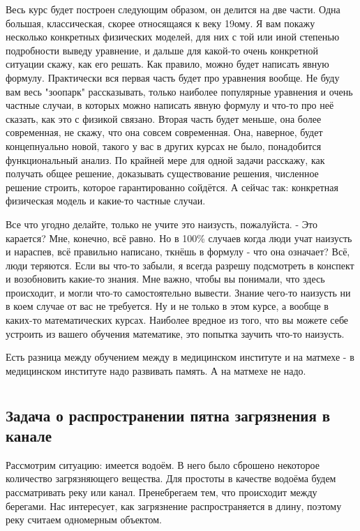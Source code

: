 Весь курс будет построен следующим образом, он делится на две части. Одна большая, классическая, скорее относящаяся к веку 19ому. Я вам покажу несколько конкретных физических моделей, для них с той или иной степенью подробности выведу уравнение, и дальше для какой-то очень конкретной ситуации скажу, как его решать. Как правило, можно будет написать явную формулу. Практически вся первая часть будет про уравнения вообще. Не буду вам весь "зоопарк" рассказывать, только наиболее популярные уравнения и очень частные случаи, в которых можно написать явную формулу и что-то про неё сказать, как это с физикой связано.
Вторая часть будет меньше, она более современная, не скажу, что она совсем современная. Она, наверное, будет концепнуально новой, такого у вас в других курсах не было, понадобится функциональный анализ. По крайней мере для одной задачи расскажу, как получать общее решение, доказывать существование решения, численное решение строить, которое гарантированно сойдётся.
А сейчас так: конкретная физическая модель и какие-то частные случаи.

Все что угодно делайте, только не учите это наизусть, пожалуйста.
- Это карается?
Мне, конечно, всё равно. Но в 100\% случаев когда люди учат наизусть и нараспев, всё правильно написано, ткнёшь в формулу - что она означает? Всё, люди теряются. Если вы что-то забыли, я всегда разрешу подсмотреть в конспект и  возобновить какие-то знания. Мне важно, чтобы вы понимали, что здесь происходит, и могли что-то самостоятельно вывести. Знание чего-то наизусть ни в коем случае от вас не требуется. Ну и не только в этом курсе, а вообще в каких-то математических курсах. Наиболее вредное из того, что вы можете себе устроить из вашего обучения математике, это попытка заучить что-то наизусть.

Есть разница между обучением между в медицинском институте и на матмехе - в медицинском институте надо развивать память. А на матмехе не надо.


\chapter{}
\section{Задача о распространении пятна загрязнения в канале}
Рассмотрим ситуацию: имеется водоём. В него было сброшено некоторое количество загрязняющего вещества.
Для простоты в качестве водоёма будем рассматривать реку или канал. Пренебрегаем тем, что происходит между берегами. Нас интересует, как загрязнение распространяется в длину, поэтому реку считаем одномерным объектом.

